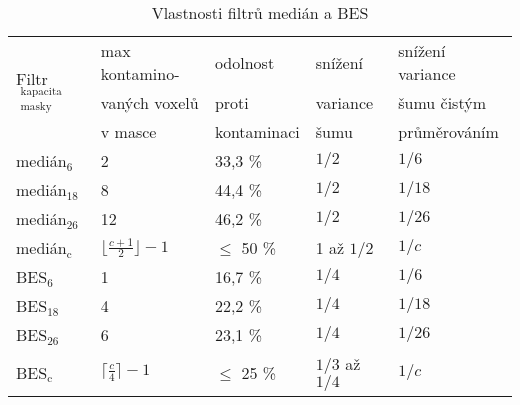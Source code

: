 \begin{table}[h]\label{tab med BES}
    \begin{center}
    \begin{tabular}{lllll}
      \toprule
      \multirow{3}{*}{Filtr$_{\mathrm{\substack{kapacita\\ masky}}}$} & max kontamino- & odolnost    & snížení    & snížení variance \\
                                                    & vaných voxelů   & proti       & variance   & šumu čistým      \\
                                                    & v masce         & kontaminaci & šumu       & průměrováním     \\
      \midrule
      medián$_{\mathrm{6}}$             & 2                 & 33,3 \%       & $1/2$    & $1/6$ \\
      medián$_{\mathrm{18}}$            & 8                 & 44,4 \%       & $1/2$    & $1/18$ \\
      medián$_{\mathrm{26}}$            & 12                & 46,2 \%       & $1/2$    & $1/26$  \\
      medián$_{\mathrm{c}}$             & $\lfloor\frac{c+1}{2}\rfloor-1$& $\le$ 50 \%& 1 až $1/2$& $1/c$\\
      BES$_{\mathrm{6}}$                & 1                 & 16,7 \%       & $1/4$   & $1/6$ \\
      BES$_{\mathrm{18}}$               & 4                 & 22,2 \%       & $1/4$   & $1/18$ \\
      BES$_{\mathrm{26}}$               & 6                 & 23,1 \%       & $1/4$   & $1/26$ \\
      BES$_{\mathrm{c}}$                & $\lceil\frac{c}{4}\rceil-1$& $\le$ 25 \%& $1/3$ až $1/4$& $1/c$\\
      \bottomrule
    \end{tabular}
    \caption{Vlastnosti filtrů medián a BES}
    \end{center}
\end{table}

